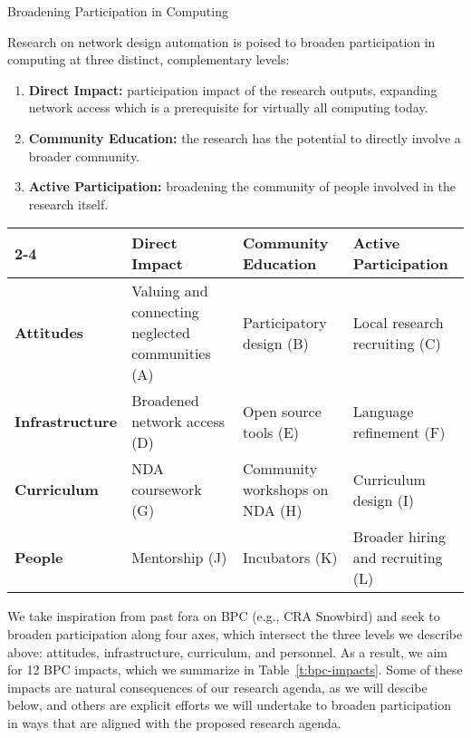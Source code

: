 \documentclass[10pt]{article}
\begin{document}
 \begin{Large}
\begin{center}
Broadening Participation in Computing
\end{center}
\end{Large}

Research on network design automation is poised to broaden participation in computing at three distinct, complementary levels:
\begin{enumerate}
\item \textbf{Direct Impact:} participation impact of the research outputs, expanding network access which is a prerequisite for virtually all computing today.
\item \textbf{Community Education:} the research has the potential to directly involve a broader community.
\item \textbf{Active Participation:} broadening the community of people involved in the research itself.
\end{enumerate}

\begin{table*}
\centering
\begin{tabular}{l|p{1.6in}|p{1.6in}|p{1.6in}|}
\cline{2-4}
 & \textbf{Direct Impact} & \textbf{Community Education} & \textbf{Active Participation} \\ \hline
\multicolumn{1}{|l|}{\textbf{Attitudes}} & Valuing and connecting neglected communities (A) & Participatory design (B) & Local research recruiting (C) \\ \hline
\multicolumn{1}{|l|}{\textbf{Infrastructure}} & Broadened network access (D) & Open source tools (E) & Language refinement (F) \\ \hline
\multicolumn{1}{|l|}{\textbf{Curriculum}} & NDA coursework (G) & Community workshops on NDA (H) & Curriculum design (I) \\ \hline
\multicolumn{1}{|l|}{\textbf{People}} & Mentorship (J) & Incubators (K) & Broader hiring and recruiting (L) \\ \hline
\end{tabular}
\caption{NDA Broadening Participation Activities.}
\label{t:bpc-impacts}
\end{table*}

We take inspiration from past fora on BPC (e.g., CRA Snowbird) and seek to broaden participation along four axes, which intersect the three levels we describe above: attitudes, infrastructure, curriculum, and personnel.  As a result, we aim for 12 BPC impacts, which we summarize in Table~\ref{t:bpc-impacts}.  Some of these impacts are natural consequences of our research agenda, as we will descibe below, and others are explicit efforts we will undertake to broaden participation in ways that are aligned with the proposed research agenda.
\end{document}

